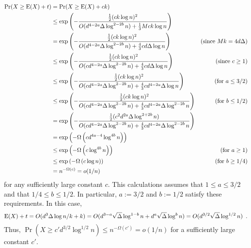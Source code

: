 \documentclass{patmorin}
\begin{document}
\begin{align*}
  \Pr(X\ge \mathrm{E}(X)+t)
  & = \Pr(X\ge \mathrm{E}(X)+ck) \\
  & \le \exp \left(-\frac{\tfrac{1}{2}(ck\log n)^2}{O(d^{4-2a}\Delta\log^{2-2b}n) + \tfrac{1}{3}Mck\log n}\right) \\
  & = \exp \left(-\frac{\tfrac{1}{2}(ck\log n)^2}{O(d^{4-2a}\Delta\log^{2-2b}n) + \tfrac{4}{3}cd\Delta\log n}\right)
    & \text{(since $Mk=4d\Delta$)} \\
  & \le \exp \left(-\frac{\tfrac{1}{2}(ck\log n)^2}{O(cd^{4-2a}\Delta\log^{2-2b}n) + \tfrac{4}{3}cd\Delta\log n}\right)
  & \text{(since $c\ge 1$)}\\
  & \le \exp \left(-\frac{\tfrac{1}{2}(ck\log n)^2}{O(cd^{4-2a}\Delta\log^{2-2b}n) + \tfrac{4}{3}cd^{4-2a}\Delta\log n}\right)
  & \text{(for $a\le 3/2$)}\\
  & \le \exp \left(-\frac{\tfrac{1}{2}(ck\log n)^2}{O(cd^{4-2a}\Delta\log^{2-2b}n) + \tfrac{4}{3}cd^{4-2a}\Delta\log^{2-2b}n}\right)
  & \text{(for $b\le 1/2$)}\\
  & = \exp \left(-\frac{\tfrac{1}{2}(c^2d^{2a}\Delta\log^{2+2b} n)}{O(cd^{4-2a}\Delta\log^{2-2b}n) + \tfrac{4}{3}cd^{4-2a}\Delta\log^{2-2b}n}\right) \\
  & = \exp \left(-\Omega\left(cd^{4a-4}\log^{4b}n\right)\right) \\
  & \le \exp \left(-\Omega\left(c\log^{4b}n\right)\right)
  & \text{(for $a\ge 1$)}\\
  & \le \exp \left(-\Omega\left(c\log n\right)\right)
  & \text{(for $b\ge 1/4$)}\\
  & = n^{-\Omega(c)} = o(1/n)
\end{align*}
for any sufficiently large constant $c$.  This calculations assumes that $1\le a\le 3/2$ and that $1/4\le b\le 1/2$.  In particular, $a:=3/2$ and $b:=1/2$ satisfy these requirements.  In this case,
\[
  \mathrm{E}(X)+t = O(d^3\Delta\log n/k + k)
  = O(d^{3-a}\sqrt{\Delta}\log^{1-b} n + d^a\sqrt{\Delta}\log^{b} n)
  = O(d^{3/2}\sqrt{\Delta}\log^{1/2}n) \enspace .
\]
Thus, $\Pr(X\ge c'd^{3/2}\log^{1/2} n) \le n^{-\Omega(c')}=o(1/n)$ for a sufficiently large constant $c'$.
\end{document}
